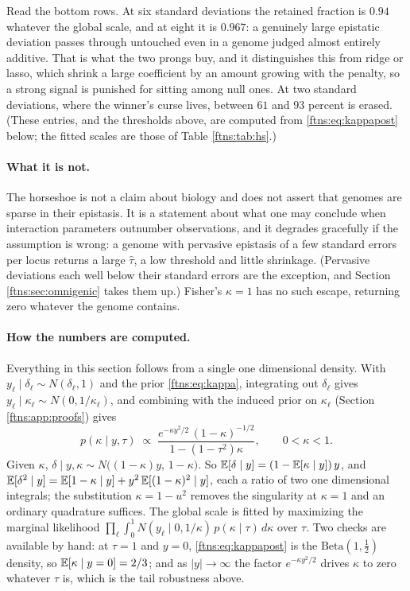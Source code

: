 Read the bottom rows. At six standard deviations the retained fraction is $0.94$ whatever the
global scale, and at eight it is $0.967$: a genuinely large epistatic deviation passes through
untouched even in a genome judged almost entirely additive. That is what the two prongs buy, and it
distinguishes this from ridge or lasso, which shrink a large coefficient by an amount growing with
the penalty, so a strong signal is punished for sitting among null ones. At two standard
deviations, where the winner's curse lives, between $61$ and $93$ percent is erased.
(These entries, and the thresholds above, are computed from \eqref{ftns:eq:kappapost} below; the
fitted scales are those of Table \ref{ftns:tab:hs}.)

\paragraph{What it is not.} The horseshoe is not a claim about biology and does not assert that
genomes are sparse in their epistasis. It is a statement about what one may conclude when
interaction parameters outnumber observations, and it degrades gracefully if the assumption is
wrong: a genome with pervasive epistasis of a few standard errors per locus returns a large $\hat\tau$, a low threshold and little shrinkage. (Pervasive deviations each well below their standard errors are the exception, and Section \ref{ftns:sec:omnigenic} takes them up.) Fisher's $\kappa=1$ has no such escape, returning zero whatever the genome contains.

\paragraph{How the numbers are computed.} Everything in this section follows from a single
one dimensional density. With $y_\ell\mid\delta_\ell\sim N(\delta_\ell,1)$ and the prior
\eqref{ftns:eq:kappa}, integrating out $\delta_\ell$ gives $y_\ell\mid\kappa_\ell\sim
N(0,1/\kappa_\ell)$, and combining with the induced prior on $\kappa_\ell$ (Section
\ref{ftns:app:proofs}) gives
\begin{equation}
p(\kappa\mid y,\tau)\;\propto\;\frac{e^{-\kappa y^2/2}\,(1-\kappa)^{-1/2}}{1-(1-\tau^2)\kappa},
\qquad 0<\kappa<1 .
\label{ftns:eq:kappapost}
\end{equation}
Given $\kappa$, $\delta\mid y,\kappa\sim N\big((1-\kappa)y,\,1-\kappa\big)$. So
$\mathbb{E}[\delta\mid y]=(1-\mathbb{E}[\kappa\mid y])\,y$, and
$\mathbb{E}[\delta^2\mid y]=\mathbb{E}[1-\kappa\mid y]+y^2\,\mathbb{E}[(1-\kappa)^2\mid y]$, each a ratio of two one
dimensional integrals; the substitution $\kappa=1-u^2$ removes the singularity at $\kappa=1$ and an
ordinary quadrature suffices. The global scale is fitted by maximizing the marginal likelihood
$\prod_\ell\int_0^1 N(y_\ell\mid0,1/\kappa)\,p(\kappa\mid\tau)\,d\kappa$ over $\tau$. Two checks are
available by hand: at $\tau=1$ and $y=0$, \eqref{ftns:eq:kappapost} is the
$\text{Beta}(1,\tfrac12)$ density, so $\mathbb{E}[\kappa\mid y=0]=2/3$; and as $|y|\to\infty$ the factor
$e^{-\kappa y^2/2}$ drives $\kappa$ to zero whatever $\tau$ is, which is the tail robustness above.

